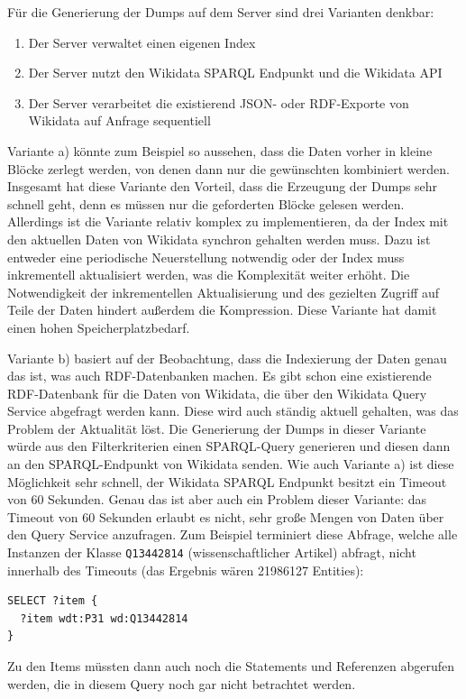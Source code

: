 Für die Generierung der Dumps auf dem Server sind drei Varianten denkbar:
\begin{enumerate}[label=\alph*) ]
  \item Der Server verwaltet einen eigenen Index
  \item Der Server nutzt den Wikidata SPARQL Endpunkt und die Wikidata API
  \item Der Server verarbeitet die existierend JSON- oder RDF-Exporte von Wikidata auf Anfrage sequentiell
\end{enumerate}
Variante a) könnte zum Beispiel so aussehen, dass die Daten vorher in kleine Blöcke zerlegt werden, von denen dann nur die gewünschten kombiniert werden.
Insgesamt hat diese Variante den Vorteil, dass die Erzeugung der Dumps sehr schnell geht, denn es müssen nur die geforderten Blöcke gelesen werden.
Allerdings ist die Variante relativ komplex zu implementieren, da der Index mit den aktuellen Daten von Wikidata synchron gehalten werden muss.
Dazu ist entweder eine periodische Neuerstellung notwendig oder der Index muss inkrementell aktualisiert werden, was die Komplexität weiter erhöht.
Die Notwendigkeit der inkrementellen Aktualisierung und des gezielten Zugriff auf Teile der Daten hindert außerdem die Kompression.
Diese Variante hat damit einen hohen Speicherplatzbedarf.

Variante b) basiert auf der Beobachtung, dass die Indexierung der Daten genau das ist, was auch RDF-Datenbanken machen.
Es gibt schon eine existierende RDF-Datenbank für die Daten von Wikidata, die über den Wikidata Query Service abgefragt werden kann.
Diese wird auch ständig aktuell gehalten, was das Problem der Aktualität löst.
Die Generierung der Dumps in dieser Variante würde aus den Filterkriterien einen SPARQL-Query generieren und diesen dann an den SPARQL-Endpunkt von Wikidata senden.
Wie auch Variante a) ist diese Möglichkeit sehr schnell, der Wikidata SPARQL Endpunkt besitzt ein Timeout von 60 Sekunden.
Genau das ist aber auch ein Problem dieser Variante: das Timeout von 60 Sekunden erlaubt es nicht, sehr große Mengen von Daten über den Query Service anzufragen. Zum Beispiel terminiert diese Abfrage, welche alle Instanzen der Klasse \verb|Q13442814| (wissenschaftlicher Artikel) abfragt, nicht innerhalb des Timeouts (das Ergebnis wären 21986127 Entities):
\begin{lstlisting}[language=SPARQL, caption=SPARQL-Query nach wissenschaftlichen Artikeln]
SELECT ?item {
  ?item wdt:P31 wd:Q13442814
} 
\end{lstlisting}
Zu den Items müssten dann auch noch die Statements und Referenzen abgerufen werden, die in diesem Query noch gar nicht betrachtet werden.

